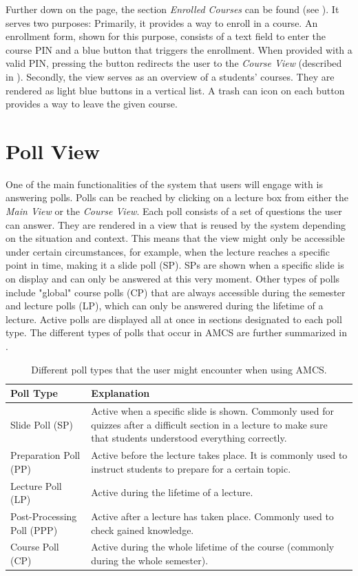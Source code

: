 Further down on the page, the section \emph{Enrolled Courses} can be found (see ). It serves two purposes: Primarily, it provides a way to enroll in a course. An enrollment form, shown for this purpose, consists of a text field to enter the course PIN and a blue button that triggers the enrollment. When provided with a valid PIN, pressing the button redirects the user to the \emph{Course View} (described in ).
Secondly, the view serves as an overview of a students' courses. They are rendered as light blue buttons in a vertical list. A trash can icon on each button provides a way to leave the given course.

\section{Poll View}
\label{section:soa:pollview}
One of the main functionalities of the system that users will engage with is answering polls.
Polls can be reached by clicking on a lecture box from either the \emph{Main View} or the \emph{Course View}.
Each poll consists of a set of questions the user can answer. They are rendered in a view that is reused by the system depending on the situation and context. This means that the view might only be accessible under certain circumstances, for example, when the lecture reaches a specific point in time, making it a slide poll (SP). SPs are shown when a specific slide is on display and can only be answered at this very moment. Other types of polls include "global" course polls (CP) that are always accessible during the semester and lecture polls (LP), which can only be answered during the lifetime of a lecture.
Active polls are displayed all at once in sections designated to each poll type.
The different types of polls that occur in AMCS are further summarized in .

\begin{table}[H]
	{\renewcommand{\arraystretch}{2}
		\begin{tabular}{ | p{5cm} | p{10cm} |}
			\hline
			Poll Type & Explanation \\ \hline \hline
			Slide Poll (SP) & Active when a specific slide is shown. Commonly used for quizzes after a difficult section in a lecture to make sure that students understood everything correctly. \\ \hline
			Preparation Poll (PP) & Active before the lecture takes place. It is commonly used to instruct students to prepare for a certain topic. \\ \hline
			Lecture Poll (LP) & Active during the lifetime of a lecture. \\ \hline
			Post-Processing Poll (PPP) & Active after a lecture has taken place. Commonly used to check gained knowledge. \\ \hline
			Course Poll (CP) & Active during the whole lifetime of the course (commonly during the whole semester). \\
			\hline
		\end{tabular}
	}
	\caption{Different poll types that the user might encounter when using AMCS.}
	\label{tab:pollTypes}
\end{table}

